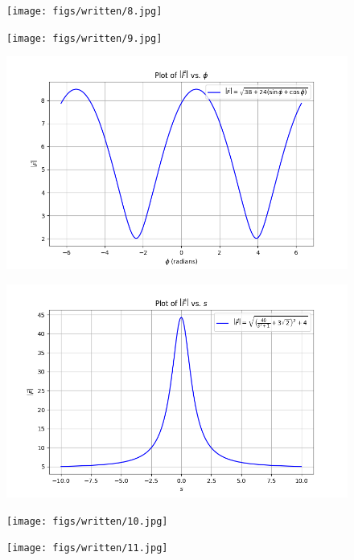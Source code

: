 \documentclass{article}
\begin{document}
\begin{figure}[H]
    \centering
    \texttt{[image: figs/written/8.jpg]}
\end{figure}
\begin{figure}[H]
    \centering
    \texttt{[image: figs/written/9.jpg]}
\end{figure}
\begin{figure}[H]
    \centering
    \includegraphics[width=\textwidth]{figs/5a.png}
\end{figure}
\begin{figure}[H]
    \centering
    \includegraphics[width=\textwidth]{figs/5b.png}
\end{figure}
\begin{figure}[H]
    \centering
    \texttt{[image: figs/written/10.jpg]}
\end{figure}
\begin{figure}[H]
    \centering
    \texttt{[image: figs/written/11.jpg]}
\end{figure}
\end{document}
